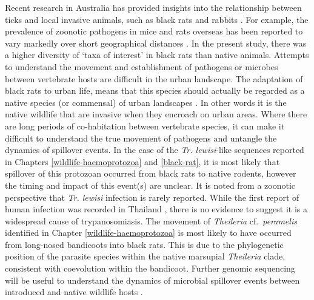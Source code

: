 \documentclass[a4paper, nobind]{templates/ociamthesis}
\begin{document}
Recent research in Australia has provided insights into the relationship between ticks and local invasive animals, such as black rats and rabbits \autocite{lydeckerPeriurbanBlackRats2019,taylorInvasiveRabbitsHost2020}.
For example, the prevalence of zoonotic pathogens in mice and rats overseas has been reported to vary markedly over short geographical distances \autocite{rothenburgerEnvironmentalFactorsZoonotic2017}.
In the present study, there was a higher diversity of `taxa of interest' in black rats than native animals.
Attempts to understand the movement and establishment of pathogens or microbes between vertebrate hosts are difficult in the urban landscape.
The adaptation of black rats to urban life, means that this species should actually be regarded as a native species (or commensal) of urban landscapes \autocite{banksEcologicalImpactsCommensal2015}.
In other words it is the native wildlife that are invasive when they encroach on urban areas.
Where there are long periods of co-habitation between vertebrate species, it can make it difficult to understand the true movement of pathogens and untangle the dynamics of spillover events.
In the case of the \emph{Tr. lewisi}-like sequences reported in Chapters \ref{wildlife-haemoprotozoa} and \ref{black-rat}, it is most likely that spillover of this protozoan occurred from black rats to native rodents, however the timing and impact of this event(s) are unclear.
It is noted from a zoonotic perspective that \emph{Tr. lewisi} infection is rarely reported. While the first report of human infection was recorded in Thailand \autocite{sarataphanDiagnosisTrypanosomaLewisilike2007}, there is no evidence to suggest it is a widespread cause of trypanosomiasis.
The movement of \emph{Theileria} cf.~\emph{peramelis} identified in Chapter \ref{wildlife-haemoprotozoa} is most likely to have occurred from long-nosed bandicoots into black rats.
This is due to the phylogenetic position of the parasite species within the native marsupial \emph{Theileria} clade, consistent with coevolution within the bandicoot.
Further genomic sequencing will be useful to understand the dynamics of microbial spillover events between introduced and native wildlife hosts \autocite{zohdyCoevolutionEffectDriver2019}.
\end{document}
